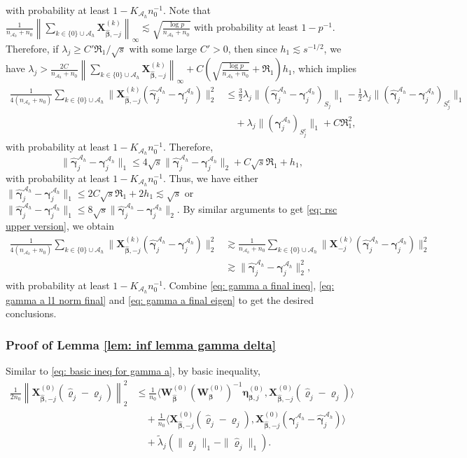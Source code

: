 \documentclass[12pt]{article}
\newcommand{\infnorma}[1]{\left\|#1\right\|_{\infty}}
\newcommand{\twonorma}[1]{\left\|#1\right\|_{2}}
\newcommand{\twonorm}[1]{\|#1\|_{2}}
\newcommand{\onenorm}[1]{\|#1\|_{1}}
\newcommand{\bbeta}{\bm{\beta}}
\newcommand{\hbeta}{\hat{\bm{\beta}}}
\newcommand{\brho}{\bm{\varrho}}
\newcommand{\hrho}{\hat{\bm{\varrho}}}
\newcommand{\tlambda}{\tilde{\lambda}}
\newcommand{\bgammaah}{\bm{\gamma}^{\mah}}
\newcommand{\hgammaah}{\hat{\bm{\gamma}}^{\mah}}
\newcommand{\bXk}[1]{\bm{X}^{(#1)}}
\newcommand{\bmetak}[1]{\bm{\eta}^{(#1)}}
\newcommand{\bWk}[1]{\bm{W}^{(#1)}}
\newcommand{\mah}{\mathcal{A}_h}
\newcommand{\nah}{n_{\mathcal{A}_h}}
\newcommand{\transet}{\{0\}\cup \mah}
\newcommand{\Kah}{K_{\mah}}
\newcommand{\<}{\langle}
\renewcommand{\>}{\rangle}
\begin{document}
with probability at least $1-\Kah n_0^{-1}$. Note that $\frac{1}{\nah+n_0}\infnorma{\sum_{k \in \transet}\bXk{k}_{\hbeta, -j}} \lesssim \sqrt{\frac{\log p}{\nah+n_0}}$ with probability at least $1-p^{-1}$. Therefore, if $\lambda_j \geq C'\Re_1/\sqrt{s}$ with some large $C'>0$, then since $h_1 \lesssim s^{-1/2}$, we have $\lambda_j > \frac{2C}{\nah+n_0}\infnorma{\sum_{k \in \transet}\bXk{k}_{\hbeta, -j}} + C\left(\sqrt{\frac{\log p}{\nah+n_0}} + \Re_1\right)h_1$, which implies
\begin{align}
	\frac{1}{4(\nah+n_0)}\sum_{k \in \transet} \twonorm{\bXk{k}_{\hbeta, -j}(\hgammaah_j-\bgammaah_j)}^2 &\leq \frac{3}{2}\lambda_j\onenorm{(\hgammaah_j -\bgammaah_j)_{S_j}} - \frac{1}{2}\lambda_j\onenorm{(\hgammaah_j -\bgammaah_j)_{S_j^c}}\\
	&\quad + \lambda_j\onenorm{(\bgammaah_j)_{S_j^c}} + C\Re_1^2, \label{eq: gamma a final ineq}
\end{align}
with probability at least $1-\Kah n_0^{-1}$. Therefore,
\begin{equation}
	\onenorm{\hgammaah_j -\bgammaah_j} \leq 4\sqrt{s}\twonorm{\hgammaah_j -\bgammaah_j} + C\sqrt{s}\Re_1 + h_1, \label{eq: gamma a l1 norm final}
\end{equation}
with probability at least $1-\Kah n_0^{-1}$.
Thus, we have either $\onenorm{\hgammaah_j -\bgammaah_j} \leq 2C\sqrt{s}\Re_1 + 2h_1 \lesssim \sqrt{s}$ or $\onenorm{\hgammaah_j -\bgammaah_j} \leq 8\sqrt{s}\twonorm{\hgammaah_j -\bgammaah_j}$. By similar arguments to get \eqref{eq: rsc upper version}, we obtain
\begin{align}
	\frac{1}{4(\nah+n_0)}\sum_{k \in \transet} \twonorm{\bXk{k}_{\hbeta, -j}(\hgammaah_j-\bgammaah_j)}^2 &\gtrsim \frac{1}{\nah+n_0}\sum_{k \in \transet} \twonorm{\bXk{k}_{-j}(\hgammaah_j-\bgammaah_j)}^2 \\
	&\gtrsim \twonorm{\hgammaah_j-\bgammaah_j}^2, \label{eq: gamma a final eigen}
\end{align}
with probability at least $1-\Kah n_0^{-1}$. Combine \eqref{eq: gamma a final ineq},  \eqref{eq: gamma a l1 norm final} and \eqref{eq: gamma a final eigen} to get the desired conclusions.

\subsubsection{Proof of Lemma \ref{lem: inf lemma gamma delta}}
Similar to \eqref{eq: basic ineq for gamma a}, by basic inequality, 
\begin{align}
	\frac{1}{2n_0}\twonorma{\bXk{0}_{\hbeta, -j}(\hrho_j - \brho_j)}^2 &\leq \frac{1}{n_0}\<\bWk{0}_{\hbeta}(\bWk{0}_{\bbeta})^{-1}\bmetak{0}_{\bbeta, j}, \bXk{0}_{\hbeta, -j}(\hrho_j - \brho_j)\> \\
	&\quad + \frac{1}{n_0}\<\bXk{0}_{\hbeta, -j}(\hrho_j - \brho_j), \bXk{0}_{\hbeta, -j}(\bgammaah_j-\hgammaah_j)\> \\
	&\quad + \tlambda_j(\onenorm{\brho_j} - \onenorm{\hrho_j}).
\end{align}
\end{document}
